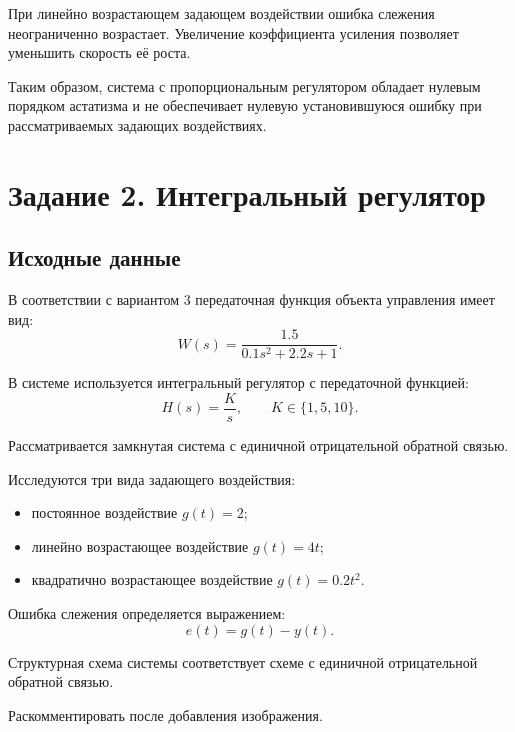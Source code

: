 \documentclass[12pt, a4paper]{article}
\begin{document}
При линейно возрастающем задающем воздействии
ошибка слежения неограниченно возрастает.
Увеличение коэффициента усиления позволяет
уменьшить скорость её роста.

Таким образом, система с пропорциональным
регулятором обладает нулевым порядком астатизма
и не обеспечивает нулевую установившуюся ошибку
при рассматриваемых задающих воздействиях.




\newpage
\section{Задание 2. Интегральный регулятор}

\subsection{Исходные данные}

В соответствии с вариантом 3 передаточная функция
объекта управления имеет вид:
\begin{equation*}
    W(s)=\frac{1.5}{0.1s^2+2.2s+1}.
\end{equation*}

В системе используется интегральный регулятор
с передаточной функцией:
\begin{equation}
    \boxed{
    H(s)=\frac{K}{s}
    },
    \qquad K\in\{1,5,10\}.
\end{equation}

Рассматривается замкнутая система с единичной
отрицательной обратной связью.

Исследуются три вида задающего воздействия:
\begin{itemize}
    \item постоянное воздействие $g(t)=2$;
    \item линейно возрастающее воздействие $g(t)=4t$;
    \item квадратично возрастающее воздействие
    $g(t)=0.2t^2$.
\end{itemize}

Ошибка слежения определяется выражением:
\[
    e(t)=g(t)-y(t).
\]

Структурная схема системы соответствует схеме
с единичной отрицательной обратной связью.

Раскомментировать после добавления изображения.
\end{document}
